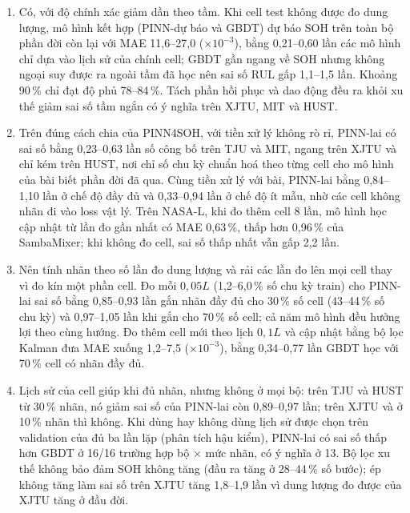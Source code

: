 \documentclass[12pt,a4paper,oneside]{report}
\theoremstyle{plain}
\theoremstyle{definition}
\begin{document}
\begin{enumerate}[label=\textbf{CH\arabic*.}]
      16/16 trường hợp (tỉ số 0{,}67--0{,}95) và thấp hơn GBDT ở 10/16 trường hợp, 8 có ý nghĩa thống kê;
      GBDT chỉ còn tốt hơn có ý nghĩa ở 1 trường hợp.
      Phần lớn lợi ích đến từ việc kết hợp hai mô hình có lệch theo cell chỉ tương quan ở mức vừa; phần vật lý vẫn giúp khi ít
      nhãn (so với cùng công thức dùng MLP, tỉ số 0{,}72 ở 10\,\% nhãn).
\item Có, với độ chính xác giảm dần theo tầm. Khi cell test không được đo dung lượng, mô hình kết hợp
      (PINN-dự báo và GBDT) dự báo SOH trên toàn bộ phần đời còn lại với MAE 11{,}6--27{,}0 ($\times10^{-3}$), bằng 0{,}21--0{,}60
      lần các mô hình chỉ dựa vào lịch sử của chính cell; GBDT gần ngang về SOH nhưng không ngoại suy được ra ngoài
      tầm đã học nên sai số RUL gấp 1{,}1--1{,}5 lần. Khoảng 90\,\% chỉ đạt độ phủ 78--84\,\%. Tách phần hồi phục và dao động đều ra khỏi xu thế giảm sai số tầm ngắn có ý nghĩa trên XJTU, MIT và HUST.
\item Trên đúng cách chia của PINN4SOH, với tiền xử lý không rò rỉ, PINN-lai có sai số bằng 0{,}23--0{,}63 lần số công
      bố trên TJU và MIT, ngang trên XJTU và chỉ kém trên HUST, nơi chỉ số chu kỳ chuẩn hoá theo từng cell cho mô hình của bài biết phần đời đã qua. Cùng tiền xử lý với bài, PINN-lai bằng 0{,}84--1{,}10 lần ở chế độ đầy đủ và 0{,}33--0{,}94 lần ở chế độ
      ít mẫu, nhờ các cell không nhãn đi vào loss vật lý. Trên NASA-L, khi đo thêm cell 8 lần, mô hình học cập nhật từ lần đo gần nhất có MAE 0{,}63\,\%, thấp hơn 0{,}96\,\% của SambaMixer; khi không đo cell, sai số thấp nhất vẫn gấp 2{,}2 lần.
\item Nên tính nhãn theo số lần đo dung lượng và rải các lần đo lên mọi cell thay vì đo kín một phần cell. Đo mỗi
      $0{,}05L$ (1{,}2--6{,}0\,\% số chu kỳ train) cho PINN-lai sai số bằng 0{,}85--0{,}93 lần gắn nhãn đầy đủ cho 30\,\% số cell (43--44\,\% số
      chu kỳ) và 0{,}97--1{,}05 lần khi gắn cho 70\,\% số cell; cả năm mô hình đều hưởng lợi theo cùng hướng. Đo thêm cell mới theo lịch $0{,}1L$ và cập nhật bằng bộ lọc Kalman đưa MAE xuống 1{,}2--7{,}5
      ($\times10^{-3}$), bằng 0{,}34--0{,}77 lần GBDT học với 70\,\% cell có nhãn đầy đủ.
\item Lịch sử của cell giúp khi đủ nhãn, nhưng không ở mọi bộ: trên TJU và HUST từ 30\,\% nhãn, nó giảm sai số
      của PINN-lai còn 0{,}89--0{,}97 lần; trên XJTU và ở 10\,\% nhãn thì không. Khi dùng hay không dùng lịch sử được chọn
      trên validation của đủ ba lần lặp (phân tích hậu kiểm), PINN-lai có sai số thấp hơn GBDT ở 16/16 trường hợp
      bộ $\times$ mức nhãn, có ý nghĩa ở 13. Bộ lọc xu thế không bảo đảm SOH không tăng (đầu ra tăng ở 28--44\,\% số bước); ép không tăng làm sai số
      trên XJTU tăng 1{,}8--1{,}9 lần vì dung lượng đo được của XJTU tăng ở đầu đời.
\end{enumerate}
\end{document}

